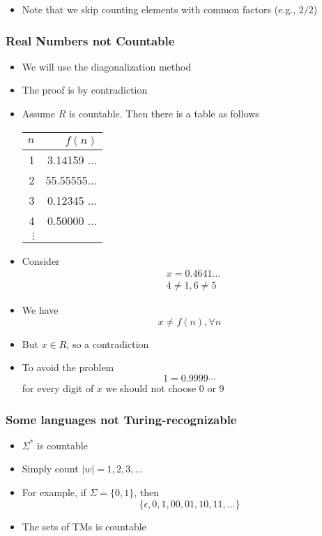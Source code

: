 \begin{frame}[allowframebreaks]
\begin{itemize}
\item Note that we skip counting elements with common factors (e.g., $2/2$)
\end{itemize}\end{frame} \begin{frame}[allowframebreaks] \frametitle{Real Numbers not Countable}
  \begin{itemize}
\item We will use the diagonalization method 
\item The proof is by contradiction
\item Assume $R$ is countable. Then there is a table as follows
  \begin{center}
  \begin{tabular}{r|r}
$n$ & $f(n)$ \\ \hline
1 & 3.14159 $\ldots$\\
2 & 55.55555$\ldots$\\
3 & 0.12345 $\ldots$ \\
4 & 0.50000 $\ldots$ \\
$\vdots$ & 
  \end{tabular}
\end{center}

\item Consider
  \begin{equation*}
    \begin{split}
&    x=0.4641\ldots\\
&    4\neq 1, 6 \neq 5
  \end{split}
\end{equation*}
\item We have
  \begin{equation*}
x \neq f(n), \forall n
\end{equation*}
\item But $x \in R$, so a contradiction
\item To avoid the problem
  \begin{equation*}
  1=0.9999\cdots
\end{equation*}
for every digit of $x$ we should not choose 0 or 9
\end{itemize}\end{frame} \begin{frame}[allowframebreaks] \frametitle{Some languages not Turing-recognizable}
    \begin{itemize}
\item $\Sigma^*$ is countable

\item [] Simply count $|w|=1,2,3,\ldots$
\item For example, if $\Sigma = \{0, 1\}$, then
  \begin{equation*}
    \{ \epsilon, 0, 1, 00, 01, 10, 11, \ldots \}
  \end{equation*}
\item The sets of TMs is countable


\end{itemize}
\end{frame}
